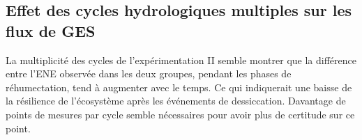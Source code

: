%
%
%
%
%
%
%

\subsection{Effet des cycles hydrologiques multiples sur les flux de GES}

La multiplicité des cycles de l'expérimentation II semble montrer que la différence entre l'ENE observée dans les deux groupes, pendant les phases de réhumectation, tend à augmenter avec le temps.
Ce qui indiquerait une baisse de la résilience de l'écosystème après les événements de dessiccation.
Davantage de points de mesures par cycle semble nécessaires pour avoir plus de certitude sur ce point.


